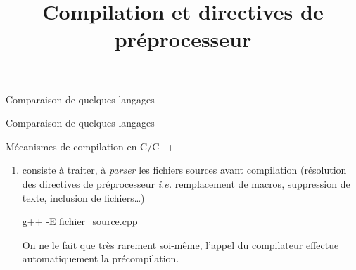 \documentclass[c]{beamer}
\title{Compilation et directives de préprocesseur}
\begin{document}
\maketitle

\begin{frame}{Comparaison de quelques langages}
\end{frame}

\begin{frame}{Comparaison de quelques langages}
\end{frame}

\begin{frame}{Mécanismes de compilation en C/C++}
\begin{enumerate}
\item {} consiste à traiter, à \emph{parser} les fichiers sources
avant compilation (résolution des directives de préprocesseur
\emph{i.e.} remplacement de macros, suppression de texte, inclusion de
fichiers\ldots{})

\begin{prompt}
g++ -E fichier\_source.cpp
\end{prompt}

{\footnotesize On ne le fait que très rarement soi-même, l'appel du compilateur effectue automatiquement la précompilation.}

\end{enumerate}
\end{frame}
\end{document}

